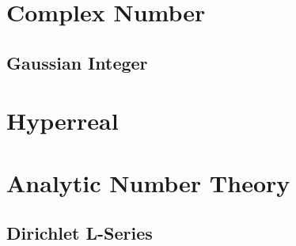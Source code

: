 \section{Complex Number}\label{sec:complex_number}

\subsection{Gaussian Integer}\label{sec:gaussian_integer}



\section{Hyperreal}\label{sec:hyperreal}



\section{Analytic Number Theory}\label{sec:analytic_number_theory}
\subsection{Dirichlet L-Series}\label{sec:l_series}
